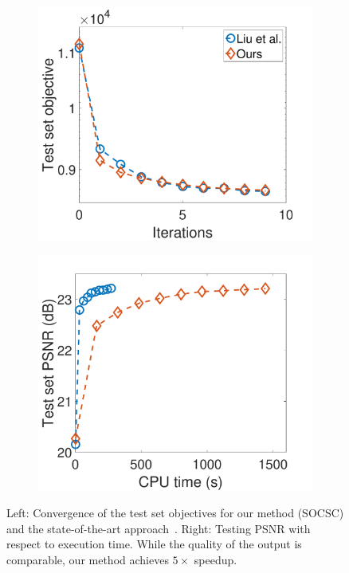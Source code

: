 \begin{figure}[h]
\centering
\begin{subfigure}{0.45\textwidth}
  \includegraphics[width=1\linewidth]{figure/onlineVSliu-ite.pdf}
\end{subfigure} 
\begin{subfigure}{0.45\textwidth}
  \includegraphics[width=1\linewidth]{figure/onlineVSliu-time.pdf}
\end{subfigure}

\caption{Left: Convergence of the test set objectives for our method (SOCSC) and the state-of-the-art approach~\cite{liu-2018-first}. Right: Testing PSNR with respect to execution time. While the quality of the output is comparable, our method achieves $5 \times$ speedup. }
\label{fig:onlineSmall}
\end{figure}

